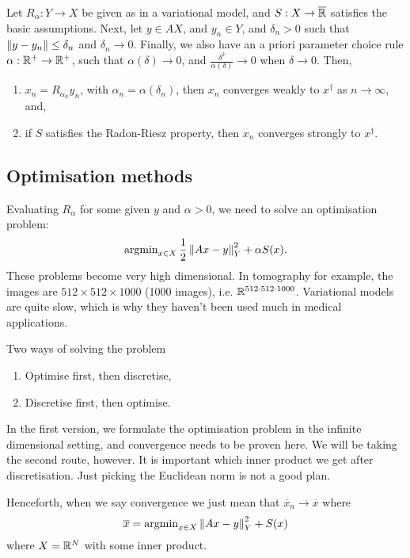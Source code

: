 \documentclass[12pt]{article}
\begin{document}
\begin{theorem}
    Let $R_\alpha:Y\to X$ be given as in a variational model, and $S:X\to \overline{\mathbb{R}}$ satisfies the basic assumptions. Next, let $y\in AX$, and $y_n\in Y$, and $\delta_n>0$ such that $\left\lVert y-y_n\right\rVert\leq \delta_n$ and $\delta_n\to 0$. Finally, we also have an a priori parameter choice rule $\alpha:\mathbb{R}^+\to \mathbb{R}^+$, such that $\alpha(\delta)\to 0$, and $\frac{\delta^2}{\alpha(\delta)}\to 0$ when $\delta \to 0$. Then, 
    \begin{enumerate}[label=(\alph*)]
        \item $x_n=R_{\alpha_n}y_n$, with $\alpha_n = \alpha(\delta_n)$, then $x_n$ converges weakly to $x^\dagger $ as $n\to \infty$, and,
        \item if $S$ satisfies the Radon-Riesz property, then $x_n$ converges strongly to $x^\dagger $.
    \end{enumerate}
\end{theorem}

\subsection{Optimisation methods}
Evaluating $R_\alpha$ for some given $y$ and $\alpha>0$, we need to solve an optimisation problem:
\begin{equation*}
    \operatorname{argmin}_{x\in X} \frac{1}{2}\left\lVert Ax-y\right\rVert_Y^2 + \alpha S(x).
\end{equation*}
These problems become very high dimensional. In tomography for example, the images are $512\times 512\times 1000$ (1000 images), i.e. $\mathbb{R}^{512\cdot512\cdot1000}$. Variational models are quite slow, which is why they haven't been used much in medical applications.

Two ways of solving the problem
\begin{enumerate}
    \item Optimise first, then discretise,
    \item Discretise first, then optimise.
\end{enumerate}
In the first version, we formulate the optimisation problem in the infinite dimensional setting, and convergence needs to be proven here. We will be taking the second route, however. It is important which inner product we get after discretisation. Just picking the Euclidean norm is not a good plan.


Henceforth, when we say convergence we just mean that $\overline{x}_n\to\overline{x}$ where 
\begin{equation*}
    \overline{x} = \operatorname{argmin}_{x\in X} \left\lVert Ax-y\right\rVert_Y^2 + S(x)
\end{equation*}
where $X=\mathbb{R}^N$ with some inner product.
\end{document}
